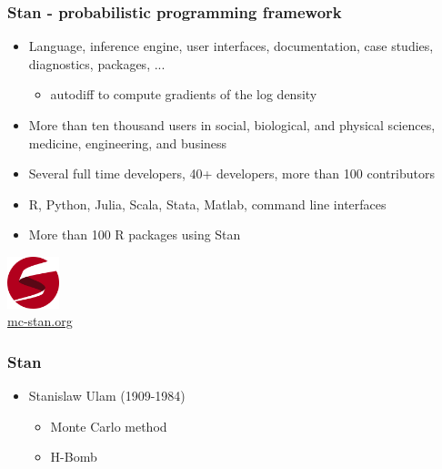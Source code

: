 \documentclass[10pt,handout]{beamer}
\begin{document}
\begin{frame}

  \frametitle{Stan - probabilistic programming framework}

   \begin{itemize}
   \item Language, inference engine, user interfaces, documentation,
     case studies, diagnostics, packages, ...
     \begin{itemize}
     \item autodiff to compute gradients of the log density
     \end{itemize}
   \item<2-> More than ten thousand users in social, biological, and
     physical sciences, medicine, engineering, and business

   \item<3-> Several full time developers, 40+ developers, more than 100 contributors
   \item<4-> R, Python, Julia, Scala, Stata, Matlab, command line interfaces
    \item<4-> More than 100 R packages using Stan
   \end{itemize}
  \vfill
  \begin{center}
    \includegraphics[width=1.5cm]{figs/stan_logo_wide.png}\\
    \url{mc-stan.org}
  \end{center}
\end{frame}

\begin{frame}

\frametitle{Stan}

  \begin{itemize}
  \item Stanislaw Ulam (1909-1984)
    \begin{itemize}
    \item Monte Carlo method
    \item H-Bomb
    \end{itemize}
  \end{itemize}

\end{frame}
\end{document}
